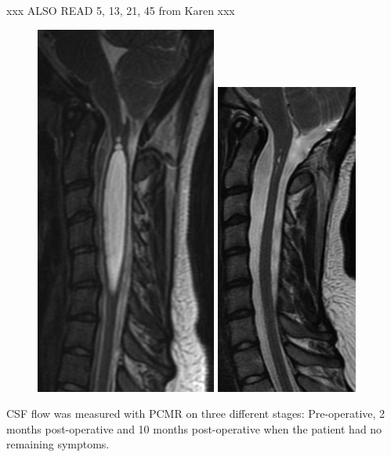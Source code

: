 xxx ALSO READ 5, 13, 21, 45 from Karen xxx
\begin{center}
\begin{figure}[!ht]
\includegraphics[scale=2]{figures/Syrinx_Subject} \includegraphics[scale=2.375]{figures/Syrinx_PostOp}
\end{figure}
\end{center}
CSF flow was measured with PCMR on three different stages: Pre-operative, 2 months post-operative and 10 months post-operative when the patient had no remaining symptoms.
 


